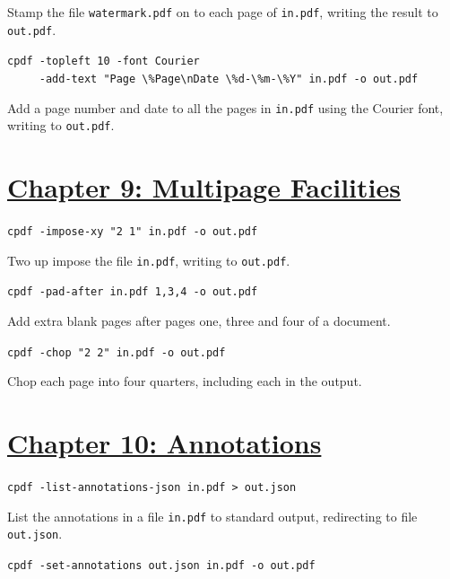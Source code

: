 \documentclass{book}
\begin{document}
\noindent Stamp the file \texttt{watermark.pdf} on to each page of \texttt{in.pdf}, writing the result to \texttt{out.pdf}.

\begin{framed}
 \noindent\small\verb?cpdf -topleft 10 -font Courier?\\
 \noindent\small\verb?     -add-text "Page \%Page\nDate \%d-\%m-\%Y" in.pdf -o out.pdf?
\end{framed}

\noindent Add a page number and date to all the pages in \texttt{in.pdf} using the Courier font, writing to \texttt{out.pdf}.

\section*{\hyperref[chap:9]{Chapter 9: Multipage Facilities}}

\begin{framed}\noindent\texttt{cpdf -impose-xy "2 1" in.pdf -o out.pdf}\end{framed}

\noindent Two up impose the file \texttt{in.pdf}, writing to \texttt{out.pdf}.

\begin{framed}\noindent\texttt{cpdf -pad-after in.pdf 1,3,4 -o out.pdf}\end{framed}

\noindent Add extra blank pages after pages one, three and four of a document.

\begin{framed}\noindent\texttt{cpdf -chop "2 2" in.pdf -o out.pdf}\end{framed}

\noindent Chop each page into four quarters, including each in the output.

\section*{\hyperref[chap:10]{Chapter 10: Annotations}}

\begin{framed}\noindent\texttt{cpdf -list-annotations-json in.pdf > out.json}\end{framed}

\noindent List the annotations in a file \texttt{in.pdf} to standard output, redirecting to file \texttt{out.json}.

\begin{framed}\noindent\texttt{cpdf -set-annotations out.json in.pdf -o out.pdf}\end{framed}
\end{document}
